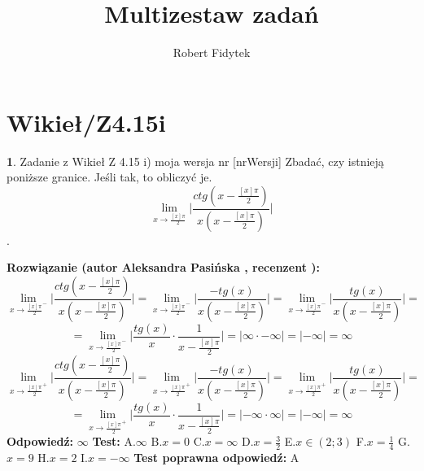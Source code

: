 \documentclass[12pt, a4paper]{article}
\title{Multizestaw zadań}
\author{Robert Fidytek}
\date{}
\theoremstyle{definition} %
\newtheorem{zad}{}
\newcommand{\kategoria}[1]{\section{#1}} %
\newcommand{\zadStart}[1]{\begin{zad}#1\newline} %
\newcommand{\zadStop}{\end{zad}}   %
\newcommand{\rozwStart}[2]{\noindent \textbf{Rozwiązanie (autor #1 , recenzent #2): }\newline} %
\newcommand{\rozwStop}{\newline}                                            %
\newcommand{\odpStart}{\noindent \textbf{Odpowiedź:}\newline}    %
\newcommand{\odpStop}{\newline}                                             %
\newcommand{\testStart}{\noindent \textbf{Test:}\newline} %
\newcommand{\testStop}{\newline} %
\newcommand{\kluczStart}{\noindent \textbf{Test poprawna odpowiedź:}\newline} %
\newcommand{\kluczStop}{\newline} %
\begin{document}
\maketitle


\kategoria{Wikieł/Z4.15i}
\zadStart{Zadanie z Wikieł Z 4.15 i) moja wersja nr [nrWersji]}
Zbadać, czy istnieją poniższe granice. Jeśli tak, to obliczyć je. $$\lim_{x\rightarrow \frac{[x]\pi}{2}}\biggl|\frac{ctg(x-\frac{[x]\pi}{2})}{x(x-\frac{[x]\pi}{2})}\biggr|$$.
\zadStop
\rozwStart{Aleksandra Pasińska}{}
$$\lim_{x\rightarrow \frac{[x]\pi}{2}^-}\biggl|\frac{ctg(x-\frac{[x]\pi}{2})}{x(x-\frac{[x]\pi}{2})}\biggr|=\lim_{x\rightarrow \frac{[x]\pi}{2}^-}\biggl|\frac{-tg(x)}{x(x-\frac{[x]\pi}{2})}\biggr|=\lim_{x\rightarrow \frac{[x]\pi}{2}^-}\biggl|\frac{tg(x)}{x(x-\frac{[x]\pi}{2})}\biggr|=$$
$$=\lim_{x\rightarrow \frac{[x]\pi}{2}^-}\biggl|\frac{tg(x)}{x}\cdot\frac{1}{x-\frac{[x]\pi}{2}}\biggr|=|\infty\cdot-\infty|=|-\infty|=\infty$$
$$\lim_{x\rightarrow \frac{[x]\pi}{2}^+}\biggl|\frac{ctg(x-\frac{[x]\pi}{2})}{x(x-\frac{[x]\pi}{2})}\biggr|=\lim_{x\rightarrow \frac{[x]\pi}{2}^+}\biggl|\frac{-tg(x)}{x(x-\frac{[x]\pi}{2})}\biggr|=\lim_{x\rightarrow \frac{[x]\pi}{2}^+}\biggl|\frac{tg(x)}{x(x-\frac{[x]\pi}{2})}\biggr|=$$
$$=\lim_{x\rightarrow \frac{[x]\pi}{2}^+}\biggl|\frac{tg(x)}{x}\cdot\frac{1}{x-\frac{[x]\pi}{2}}\biggr|=|-\infty\cdot\infty|=|-\infty|=\infty$$
\rozwStop
\odpStart
$\infty$
\odpStop
\testStart
A.$\infty$
B.$x=0$
C.$x=\infty$
D.$x=\frac{3}{2}$
E.$x\in (2;3)$
F.$x=\frac{1}{4}$
G.$x=9$
H.$x=2$
I.$x=-\infty$
\testStop
\kluczStart
A
\kluczStop
\end{document}
